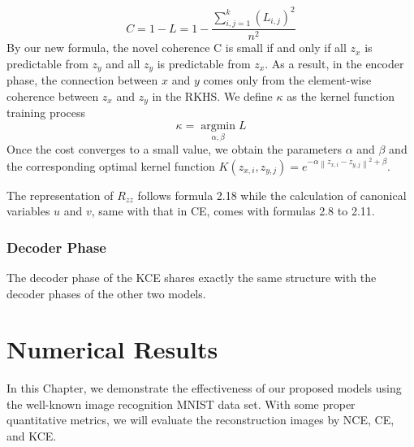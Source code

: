 \documentclass[12pt]{report} %
\newcommand{\norm}[1]{\left\lVert #1 \right\rVert}
\begin{document}
\begin{equation}
C=1-L=1-\frac{\sum_{i,j=1}^{k}(L_{i,j})^2}{n^2}
\end{equation}
By our new formula, the novel coherence C is small if and only if all $z_x$ is predictable from $z_y$ and all $z_y$ is predictable from $z_x$. As a result, in the encoder phase, the connection between $x$ and $y$ comes only from the element-wise coherence between $z_x$ and $z_y$ in the RKHS. We define $\kappa$ as the kernel function training process
\begin{equation}
\kappa=\operatorname*{argmin}_{\alpha,\beta} L
\end{equation}
Once the cost converges to a small value, we obtain the parameters $\alpha$ and $\beta$ and the corresponding optimal kernel function $K(z_{x,i},z_{y,j})=e^{-\alpha \norm{z_{x,i}-z_{y,j}}^2 + \beta}$.

The representation of $R_{zz}$ follows formula 2.18 while the calculation of canonical variables $u$ and $v$, same with that in CE, comes with formulas 2.8 to 2.11.

\subsection{Decoder Phase}
The decoder phase of the KCE shares exactly the same structure with the decoder phases of the other two models. 

\chapter{Numerical Results}
In this Chapter, we demonstrate the effectiveness of our proposed models using the well-known image recognition MNIST data set. With some proper quantitative metrics, we will evaluate the reconstruction images by NCE, CE, and KCE. 
\end{document}
